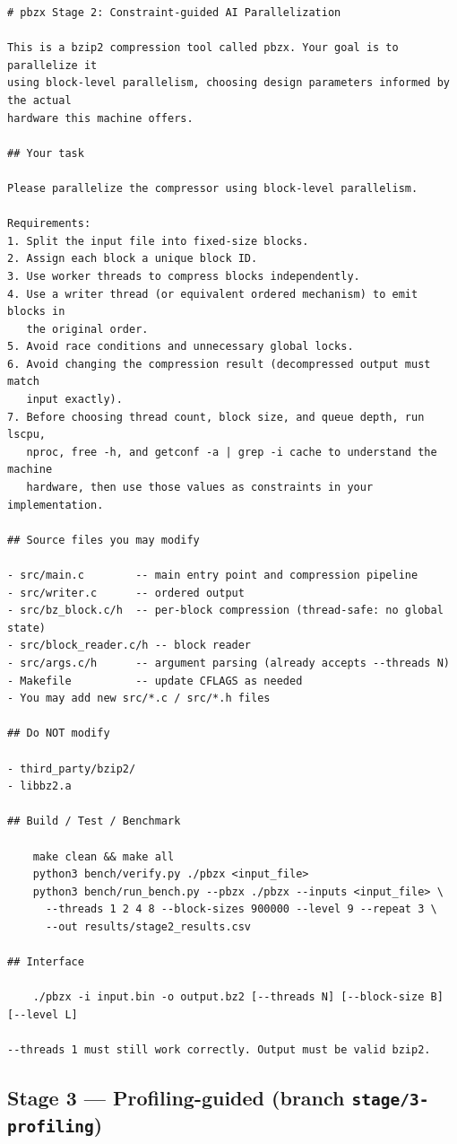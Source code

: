 \documentclass[conference]{IEEEtran}
\begin{document}
\begin{lstlisting}
# pbzx Stage 2: Constraint-guided AI Parallelization

This is a bzip2 compression tool called pbzx. Your goal is to parallelize it
using block-level parallelism, choosing design parameters informed by the actual
hardware this machine offers.

## Your task

Please parallelize the compressor using block-level parallelism.

Requirements:
1. Split the input file into fixed-size blocks.
2. Assign each block a unique block ID.
3. Use worker threads to compress blocks independently.
4. Use a writer thread (or equivalent ordered mechanism) to emit blocks in
   the original order.
5. Avoid race conditions and unnecessary global locks.
6. Avoid changing the compression result (decompressed output must match
   input exactly).
7. Before choosing thread count, block size, and queue depth, run lscpu,
   nproc, free -h, and getconf -a | grep -i cache to understand the machine
   hardware, then use those values as constraints in your implementation.

## Source files you may modify

- src/main.c        -- main entry point and compression pipeline
- src/writer.c      -- ordered output
- src/bz_block.c/h  -- per-block compression (thread-safe: no global state)
- src/block_reader.c/h -- block reader
- src/args.c/h      -- argument parsing (already accepts --threads N)
- Makefile          -- update CFLAGS as needed
- You may add new src/*.c / src/*.h files

## Do NOT modify

- third_party/bzip2/
- libbz2.a

## Build / Test / Benchmark

    make clean && make all
    python3 bench/verify.py ./pbzx <input_file>
    python3 bench/run_bench.py --pbzx ./pbzx --inputs <input_file> \
      --threads 1 2 4 8 --block-sizes 900000 --level 9 --repeat 3 \
      --out results/stage2_results.csv

## Interface

    ./pbzx -i input.bin -o output.bz2 [--threads N] [--block-size B] [--level L]

--threads 1 must still work correctly. Output must be valid bzip2.
\end{lstlisting}

\subsection*{Stage 3 --- Profiling-guided (branch \texttt{stage/3-profiling})}
\end{document}
